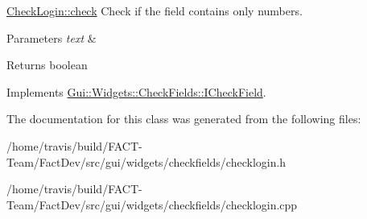 \hyperlink{classGui_1_1Widgets_1_1CheckFields_1_1CheckLogin_a66e6d426253b5219a55b7ccada37d9b9}{Check\-Login\-::check} Check if the field contains only numbers. 


\begin{DoxyParams}{Parameters}
{\em text} & \\
\hline
\end{DoxyParams}
\begin{DoxyReturn}{Returns}
boolean 
\end{DoxyReturn}


Implements \hyperlink{classGui_1_1Widgets_1_1CheckFields_1_1ICheckField_a818700a4a8c95eacfc39b85c74e71144}{Gui\-::\-Widgets\-::\-Check\-Fields\-::\-I\-Check\-Field}.



The documentation for this class was generated from the following files\-:\begin{DoxyCompactItemize}
\item 
/home/travis/build/\-F\-A\-C\-T-\/\-Team/\-Fact\-Dev/src/gui/widgets/checkfields/checklogin.\-h\item 
/home/travis/build/\-F\-A\-C\-T-\/\-Team/\-Fact\-Dev/src/gui/widgets/checkfields/checklogin.\-cpp\end{DoxyCompactItemize}
